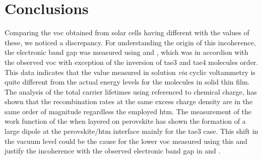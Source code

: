 \section{Conclusions}
	Comparing the \gls{voc} obtained from solar cells having different  with the  values of these, we noticed a discrepancy.
	For understanding the origin of this incoherence, the electronic band gap was measured using  and , which was in accordion with the observed \gls{voc} with exception of the inversion of \gls{tae3} and \gls{tae4} molecules order.
	This data indicates that the  value measured in solution \textsl{via} cyclic voltammetry is quite different from the actual energy levels for the molecules in solid thin film.
	The analysis of the total carrier lifetimes using  referenced to chemical charge, has shown that the recombination rates at the same excess charge density are in the same order of magnitude regardless the employed \gls{htm}.
	The measurement of the work function of the  when layered on perovskite has shown the formation of a large dipole at the perovskite\-/\gls{htm} interface mainly for the \gls{tae3} case.
	This shift in the vacuum level could be the cause for the lower \gls{voc} measured using this  and justify the incoherence with the observed electronic band gap in  and .
